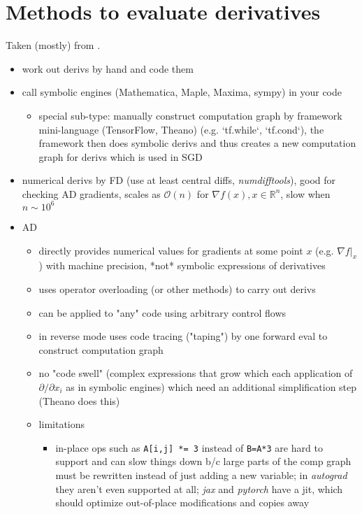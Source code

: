 \documentclass[paper=a4,11pt,headsepline]{scrartcl}
\newcommand{\ve}[1]{\ensuremath{\bm{\mathit{#1}}}}
\newcommand{\soft}[1]{\textsl{#1}\xspace}
\newcommand{\pytorch}{\soft{pytorch}}
\newcommand{\jax}{\soft{jax}}
\newcommand{\autograd}{\soft{autograd}}
\begin{document}
\section{Methods to evaluate derivatives}
%
Taken (mostly) from \cite{baydin_2018}.

\begin{itemize}
    \item work out derivs by hand and code them
    \item call symbolic engines (Mathematica, Maple, Maxima, sympy) in your code
    \begin{itemize}
        \item special sub-type: manually construct computation graph by
            framework mini-language (TensorFlow, Theano) (e.g. `tf.while`,
            `tf.cond`), the framework then does symbolic derivs and thus
            creates a new computation graph for derivs which is used in SGD
    \end{itemize}
\item numerical derivs by FD (use at least central diffs,
    \textsl{numdifftools}), good for checking AD gradients, scales as $\mathcal
    O(n)$ for $\nabla f(\ve x), \ve x\in\mathbb R^n$, slow when $n\sim 10^6$
\item AD
    \begin{itemize}
        \item directly provides numerical values for gradients at some point
            $\ve x$ (e.g. $\nabla f|_{\ve x}$) with machine precision, *not*
            symbolic expressions of derivatives
        \item uses operator overloading (or other methods) to carry out derivs
        \item can be applied to "any" code using arbitrary control flows
        \item in reverse mode uses code tracing ("taping") by one forward eval
            to construct computation graph
        \item no "code swell" (complex expressions that grow which each
            application of $\partial/\partial x_i$ as in symbolic engines)
            which need an additional simplification step (Theano does this)
        \item limitations
        \begin{itemize}
            \item in-place ops such as \texttt{A[i,j] *= 3} instead of
                \texttt{B=A*3} are hard to support and can slow things down b/c
                large parts of the comp graph must be rewritten instead of just
                adding a new variable; in \autograd they aren't even
                supported at all; \jax and \pytorch have a jit,
                which should optimize out-of-place modifications and copies
                away
        \end{itemize}
    \end{itemize}
\end{itemize}
%
\end{document}
